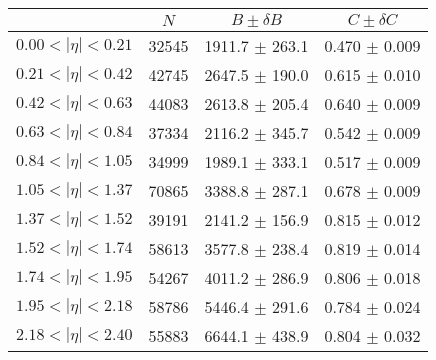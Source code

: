 \begin{tabular}{lccc}
\hline
    &   $N$   & $B \pm \delta B$  &  $C \pm \delta C$ \\
\hline
$0.00 < |\eta| <0.21$          & 32545      & 1911.7     $\pm$ 263.1 & 0.470      $\pm$ 0.009 \\
$0.21 < |\eta| <0.42$          & 42745      & 2647.5     $\pm$ 190.0 & 0.615      $\pm$ 0.010 \\
$0.42 < |\eta| <0.63$          & 44083      & 2613.8     $\pm$ 205.4 & 0.640      $\pm$ 0.009 \\
$0.63 < |\eta| <0.84$          & 37334      & 2116.2     $\pm$ 345.7 & 0.542      $\pm$ 0.009 \\
$0.84 < |\eta| <1.05$          & 34999      & 1989.1     $\pm$ 333.1 & 0.517      $\pm$ 0.009 \\
$1.05 < |\eta| <1.37$          & 70865      & 3388.8     $\pm$ 287.1 & 0.678      $\pm$ 0.009 \\
$1.37 < |\eta| <1.52$          & 39191      & 2141.2     $\pm$ 156.9 & 0.815      $\pm$ 0.012 \\
$1.52 < |\eta| <1.74$          & 58613      & 3577.8     $\pm$ 238.4 & 0.819      $\pm$ 0.014 \\
$1.74 < |\eta| <1.95$          & 54267      & 4011.2     $\pm$ 286.9 & 0.806      $\pm$ 0.018 \\
$1.95 < |\eta| <2.18$          & 58786      & 5446.4     $\pm$ 291.6 & 0.784      $\pm$ 0.024 \\
$2.18 < |\eta| <2.40$          & 55883      & 6644.1     $\pm$ 438.9 & 0.804      $\pm$ 0.032 \\
\hline
\end{tabular}
